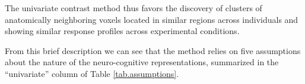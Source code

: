 The univariate contrast method thus favors the discovery of clusters of anatomically neighboring voxels located in similar regions across individuals and showing similar response profiles across experimental conditions. 

From this brief description we can see that the method relies on five assumptions about the nature of the neuro-cognitive representations, summarized in the ``univariate'' column of Table \ref{tab.assumptions}.
%
%
%
%
%
%
%

